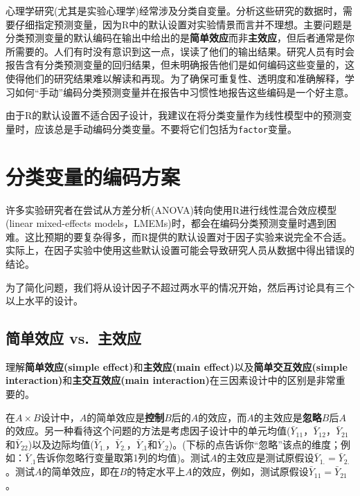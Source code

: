 \documentclass[
]{book}
\begin{document}
心理学研究(尤其是实验心理学)经常涉及分类自变量。分析这些研究的数据时，需要仔细指定预测变量，因为R中的默认设置对实验情景而言并不理想。主要问题是分类预测变量的默认编码在输出中给出的是\textbf{简单效应}而非\textbf{主效应}，但后者通常是你所需要的。人们有时没有意识到这一点，误读了他们的输出结果。研究人员有时会报告含有分类预测变量的回归结果，但未明确报告他们是如何编码这些变量的，这使得他们的研究结果难以解读和再现。为了确保可重复性、透明度和准确解释，学习如何``手动''编码分类预测变量并在报告中习惯性地报告这些编码是一个好主意。

由于R的默认设置不适合因子设计，我建议在将分类变量作为线性模型中的预测变量时，应该总是手动编码分类变量。不要将它们包括为\texttt{factor}变量。

\hypertarget{ux5206ux7c7bux53d8ux91cfux7684ux7f16ux7801ux65b9ux6848}{%
\section{分类变量的编码方案}\label{ux5206ux7c7bux53d8ux91cfux7684ux7f16ux7801ux65b9ux6848}}

许多实验研究者在尝试从方差分析(ANOVA)转向使用R进行线性混合效应模型(linear mixed-effects models，LMEMs)时，都会在编码分类预测变量时遇到困难。这比预期的要复杂得多，而R提供的默认设置对于因子实验来说完全不合适。实际上，在因子实验中使用这些默认设置可能会导致研究人员从数据中得出错误的结论。

为了简化问题，我们将从设计因子不超过两水平的情况开始，然后再讨论具有三个以上水平的设计。

\hypertarget{ux7b80ux5355ux6548ux5e94-vs.-ux4e3bux6548ux5e94}{%
\subsection{简单效应 vs.~主效应}\label{ux7b80ux5355ux6548ux5e94-vs.-ux4e3bux6548ux5e94}}

理解\textbf{简单效应(simple effect)}和\textbf{主效应(main effect)}以及\textbf{简单交互效应(simple interaction)}和\textbf{主交互效应(main interaction)}在三因素设计中的区别是非常重要的。

在\(A{\times}B\)设计中，\(A\)的简单效应是\textbf{控制}\(B\)后的\(A\)的效应，而\(A\)的主效应是\textbf{忽略}\(B\)后\(A\)的效应。另一种看待这个问题的方法是考虑因子设计中的单元均值(\(\bar{Y}_{11}\)，\(\bar{Y}_{12}\)，\(\bar{Y}_{21}\)和\(\bar{Y}_{22}\))以及边际均值(\(\bar{Y}_{1.}\)，\(\bar{Y}_{2.}\)，\(\bar{Y}_{.1}\)和\(\bar{Y}_{.2}\))。(下标的点告诉你``忽略''该点的维度；例如：\(\bar{Y}_{.1}\)告诉你忽略行变量取第1列的均值)。测试\(A\)的主效应是测试原假设\(\bar{Y}_{1.}=\bar{Y}_{2.}\)。测试\(A\)的简单效应，即在\(B\)的特定水平上\(A\)的效应，例如，测试原假设\(\bar{Y}_{11}=\bar{Y}_{21}\)。
\end{document}
